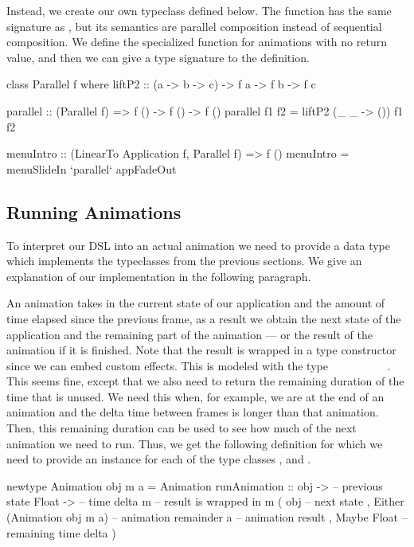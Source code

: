 Instead, we create our own  typeclass defined below. The function  has the same signature as , but its semantics are parallel composition instead of sequential composition. We define the specialized  function for animations with no return value, and then we can give a type signature to the  definition.

\begin{code}
class Parallel f where
  liftP2 :: (a -> b -> c) -> f a -> f b -> f c

parallel :: (Parallel f) => f () -> f () -> f ()
parallel f1 f2 = liftP2 (\_ _ -> ()) f1 f2

menuIntro :: (LinearTo Application f, Parallel f) => f ()
menuIntro = menuSlideIn `parallel` appFadeOut
\end{code}

\subsection{Running Animations}

To interpret our DSL into an actual animation we need to provide a data type which implements the typeclasses from the previous sections. We give an explanation of our implementation in the following paragraph.

An animation takes in the current state of our application and the amount of time elapsed since the previous frame, as a result we obtain the next state of the application and the remaining part of the animation --- or the result of the animation if it is finished. Note that the result is wrapped in a type constructor  since we can embed custom effects. This is modeled with the type ~\hs{->}~~\hs{->}~~~~~~~. This seems fine, except that we also need to return the remaining duration of the time that is unused. We need this when, for example, we are at the end of an animation and the delta time between frames is longer than that animation. Then, this remaining duration can be used to see how much of the next animation we need to run. Thus, we get the following definition for which we need to provide an instance for each of the type classes ,  and .

\begin{code}
newtype Animation obj m a = Animation {
  runAnimation ::
    obj ->                    -- previous state
    Float ->                  -- time delta
    m                         -- result is wrapped in m
      ( obj                   -- next state
      , Either
          (Animation obj m a) -- animation remainder
          a                   -- animation result
      , Maybe Float           -- remaining time delta
      )
}
\end{code}

